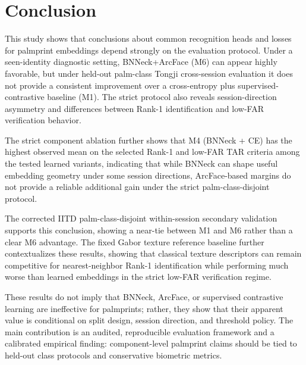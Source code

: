 \section{Conclusion}

This study shows that conclusions about common recognition heads and losses for palmprint embeddings depend strongly on the evaluation protocol. Under a seen-identity diagnostic setting, BNNeck+ArcFace (M6) can appear highly favorable, but under held-out palm-class Tongji cross-session evaluation it does not provide a consistent improvement over a cross-entropy plus supervised-contrastive baseline (M1). The strict protocol also reveals session-direction asymmetry and differences between Rank-1 identification and low-FAR verification behavior. 

The strict component ablation further shows that M4 (BNNeck + CE) has the highest observed mean on the selected Rank-1 and low-FAR TAR criteria among the tested learned variants, indicating that while BNNeck can shape useful embedding geometry under some session directions, ArcFace-based margins do not provide a reliable additional gain under the strict palm-class-disjoint protocol.

The corrected IITD palm-class-disjoint within-session secondary validation supports this conclusion, showing a near-tie between M1 and M6 rather than a clear M6 advantage. The fixed Gabor texture reference baseline further contextualizes these results, showing that classical texture descriptors can remain competitive for nearest-neighbor Rank-1 identification while performing much worse than learned embeddings in the strict low-FAR verification regime.

These results do not imply that BNNeck, ArcFace, or supervised contrastive learning are ineffective for palmprints; rather, they show that their apparent value is conditional on split design, session direction, and threshold policy. The main contribution is an audited, reproducible evaluation framework and a calibrated empirical finding: component-level palmprint claims should be tied to held-out class protocols and conservative biometric metrics.
